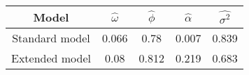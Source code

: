 \begin{tabular}{ccccc}
  \toprule
  \textbf{Model} & \textbf{\(\hat{\omega}\)} & \textbf{\(\hat{\phi}\)} & \textbf{\(\hat{\alpha}\)} & \textbf{\(\hat{\sigma^2}\)} \\\midrule
  Standard model & 0.066 & 0.78 & 0.007 & 0.839 \\
  Extended model & 0.08 & 0.812 & 0.219 & 0.683 \\\bottomrule
\end{tabular}
